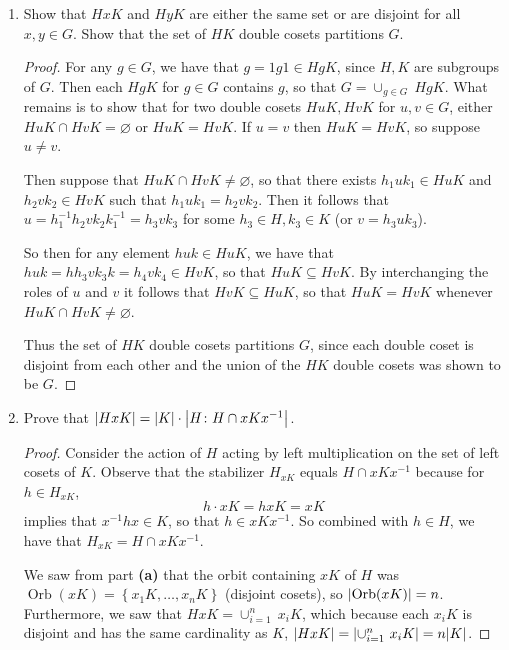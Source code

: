 \documentclass[11pt]{article}
\newcommand{\cbr}[1]{\left\{#1\right\}}
\DeclareMathOperator{\Orb}{Orb}
\begin{document}
\begin{enumerate}
\begin{enumerate}[label=\textbf{(\alph*)}]
\begin{proof}
            For any $g\in \cup_{i=1}^n~ Hx_i$, we have that $g\in Hx_j$ for some $1\leq j\leq n$. Then since $Hx_j$ is in the orbit containing $Hx$ of $K$, there exists $Hxk$ for some $k\in K$ such that $g\in Hxk = Hx_j$, which means that $g\in HxK$. Hence $\cup_{i=1}^n~ Hx_i\subseteq HxK$, so $HxK = \cup_{i=1}^n~ Hx_i$.
        \end{proof}
        \item Show that $HxK$ and $HyK$ are either the same set or are disjoint for all $x,y\in G$. Show that the set of $HK$ double cosets partitions $G$.
        \begin{proof}
            For any $g\in G$, we have that $g = 1g1 \in HgK$, since $H,K$ are subgroups of $G$. Then each $HgK$ for $g\in G$ contains $g$, so that $G = \cup_{g\in G}~ HgK$. What remains is to show that for two double cosets $HuK, HvK$ for $u,v\in G$, either $HuK \cap HvK = \varnothing$ or $HuK = HvK$. If $u=v$ then $HuK = HvK$, so suppose $u\neq v$.

            Then suppose that $HuK\cap HvK \neq \varnothing$, so that there exists $h_1uk_1\in HuK$ and $h_2vk_2\in HvK$ such that $h_1uk_1 = h_2vk_2$. Then it follows that $u = h_1^{-1}h_2vk_2k_1^{-1} = h_3vk_3$ for some $h_3\in H, k_3\in K$ (or $v = h_3uk_3$).

            So then for any element $huk\in HuK$, we have that $huk = hh_3vk_3k = h_4vk_4 \in HvK$, so that $HuK\subseteq HvK$. By interchanging the roles of $u$ and $v$ it follows that $ HvK\subseteq HuK$, so that $HuK = HvK$ whenever $HuK\cap HvK \neq \varnothing$.

            Thus the set of $HK$ double cosets partitions $G$, since each double coset is disjoint from each other and the union of the $HK$ double cosets was shown to be $G$.
        \end{proof}
        \item Prove that $\abs{HxK} = \abs{K}\cdot \abs{H\colon H\cap xKx^{-1}}$.
        \begin{proof}
            Consider the action of $H$ acting by left multiplication on the set of left cosets of $K$.
            Observe that the stabilizer $H_{xK}$ equals $H\cap xKx^{-1}$ because for $h\in H_{xK}$,
            \[h\cdot xK = hxK = xK\]
            implies that $x^{-1}hx\in K$, so that $h\in xKx^{-1}$. So combined with $h\in H$, we have that $H_{xK} = H\cap xKx^{-1}$.

            We saw from part \textbf{(a)} that the orbit containing $xK$ of $H$ was $\Orb(xK) = \cbr{x_1K,\dots, x_nK}$ (disjoint cosets), so $\abs{\Orb(xK)} = n$. Furthermore, we saw that $HxK = \cup_{i=1}^n~x_iK$, which because each $x_iK$ is disjoint and has the same cardinality as $K$, $\abs{HxK} = \abs{\cup_{i=1}^n~x_iK} = n\abs{K}$.
            

\end{proof}
\end{enumerate}
\end{enumerate}
\end{document}
